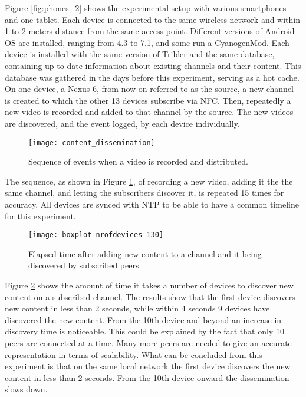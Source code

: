 Figure \ref{fig:phones_2} shows the experimental setup with various smartphones and one tablet.
Each device is connected to the same wireless network and within 1 to 2 meters distance from the same access point.
Different versions of Android OS are installed, ranging from 4.3 to 7.1, and some run a CyanogenMod.
Each device is installed with the same version of Tribler and the same database, containing up to date information about existing channels and their content.
This database was gathered in the days before this experiment, serving as a hot cache.
On one device, a Nexus 6, from now on referred to as the source, a new channel is created to which the other 13 devices subscribe via NFC.
Then, repeatedly a new video is recorded and added to that channel by the source.
The new videos are discovered, and the event logged, by each device individually.
\begin{figure}[H]
	\centering
	\texttt{[image: content\_dissemination]}
	\caption{Sequence of events when a video is recorded and distributed.}
	\label{fig:content_dissemination}
\end{figure}
The sequence, as shown in Figure \ref{fig:content_dissemination}, of recording a new video, adding it the the same channel, and letting the subscribers discover it, is repeated 15 times for accuracy.
All devices are synced with NTP to be able to have a common timeline for this experiment.

\begin{figure}[H]
	\centering %
	\texttt{[image: boxplot-nrofdevices-130]}
	\caption{Elapsed time after adding new content to a channel and it being discovered by subscribed peers.}
	\label{fig:boxplot-nr.of.devices-130}
\end{figure}
Figure \ref{fig:boxplot-nr.of.devices-130} shows the amount of time it takes a number of devices to discover new content on a subscribed channel.
The results show that the first device discovers new content in less than 2 seconds, while within 4 seconds 9 devices have discovered the new content.
From the 10th device and beyond an increase in discovery time is noticeable.
This could be explained by the fact that only 10 peers are connected at a time.
Many more peers are needed to give an accurate representation in terms of scalability.
What can be concluded from this experiment is that on the same local network the first device discovers the new content in less than 2 seconds.
From the 10th device onward the dissemination slows down.


